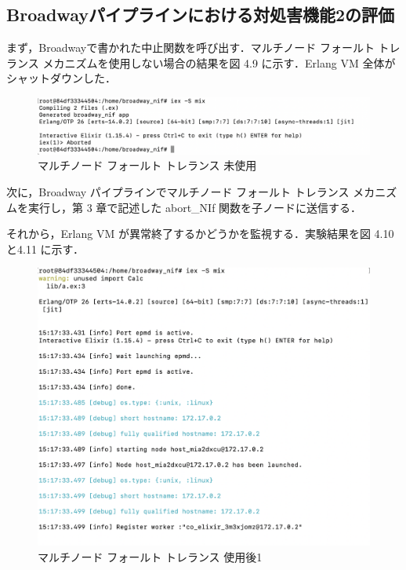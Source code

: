 \documentclass[a4paper]{jreport}	%
\begin{document}
\subsection{Broadwayパイプラインにおける対処害機能2の評価}
まず，Broadwayで書かれた中止関数を呼び出す．マルチノード フォールト トレランス メカニズムを使用しない場合の結果を図 4.9 に示す．Erlang VM 全体がシャットダウンした．

\begin{figure}[H]
\vspace{1cm}
\begin{center}
\hspace{-12cm}
\includegraphics[scale=0.7]{ja/f10.png}
\end{center}
\caption{マルチノード フォールト トレランス 未使用}
\end{figure}

次に，Broadway パイプラインでマルチノード フォールト トレランス メカニズムを実行し，第 3 章で記述した abort\_NIf 関数を子ノードに送信する．

それから，Erlang VM が異常終了するかどうかを監視する．実験結果を図 4.10と4.11 に示す．

\begin{figure}[H]
\vspace{8cm}
\begin{center}
\hspace{-8cm}
\includegraphics[scale=0.5]{ja/f12.png}
\end{center}
\caption{マルチノード フォールト トレランス 使用後1}
\end{figure}
\end{document}
